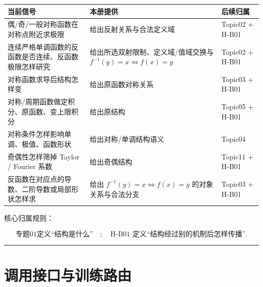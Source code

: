 \documentclass[11pt,a4paper]{ctexart}
\newcounter{none}
\begin{document}
{\def\LTcaptype{none} %
\begin{longtable}[]{@{}
  >{\raggedright\arraybackslash}p{}
  >{\raggedright\arraybackslash}p{}
  >{\raggedright\arraybackslash}p{}@{}}
\toprule\noalign{}
\begin{minipage}[b]{\linewidth}\raggedright
当前信号
\end{minipage} & \begin{minipage}[b]{\linewidth}\raggedright
本册提供
\end{minipage} & \begin{minipage}[b]{\linewidth}\raggedright
后续归属
\end{minipage} \\
\midrule\noalign{}
\endhead
\bottomrule\noalign{}
\endlastfoot
偶/奇/一般对称函数在对称点附近求极限 & 给出反射关系与合法定义域 &
Topic02 + H-B01 \\
连续严格单调函数的反函数是否连续、反函数极限怎样研究 & 给出所选双射限制、定义域/值域交换与 \(f^{-1}(y)=x\Longleftrightarrow f(x)=y\) & Topic02 + H-B01 \\
对称函数求导后结构怎样变 & 给出原函数对称关系 & Topic03 + H-B01 \\
对称/周期函数做定积分、原函数、变上限积分 & 给出原结构 & Topic05 +
H-B01 \\
对称条件怎样影响单调、极值、函数形状 & 给出对称/单调结构语义 &
Topic04 \\
奇偶性怎样筛掉 Taylor / Fourier 系数 & 给出奇偶结构 & Topic11 + H-B01 \\
反函数在对应点的导数、二阶导数或局部形状怎样求 & 给出 \(f^{-1}(y)=x\Longleftrightarrow f(x)=y\) 的对象关系与合法分支 & Topic03 + H-B01 \\
\end{longtable}
}

核心归属规则：

\[
\boxed{
\text{专题01定义“结构是什么”}
\quad;
\quad
\text{H-B01 定义“结构经过别的机制后怎样传播”}.
}
\]

\begin{center}\rule{0.5\linewidth}{0.5pt}\end{center}

\section{调用接口与训练路由}\label{ux9898ux76eeux8c03ux7528ux534fux8bae}
\end{document}
